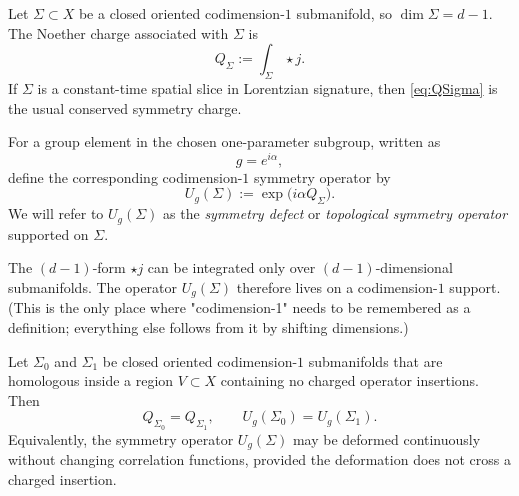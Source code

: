 \begin{definition}\label{def:zero-form-charge}
Let $\Sigma \subset X$ be a closed oriented codimension-$1$ submanifold, so $\dim \Sigma = d-1$. The Noether charge associated with $\Sigma$ is
\begin{equation}\label{eq:QSigma}
Q_\Sigma := \int_\Sigma \star j.
\end{equation}
If $\Sigma$ is a constant-time spatial slice in Lorentzian signature, then \eqref{eq:QSigma} is the usual conserved symmetry charge.
\end{definition}

\begin{definition}\label{def:zero-form-defect}
For a group element in the chosen one-parameter subgroup, written as
\begin{equation*}
g=e^{i\alpha},
\end{equation*}
define the corresponding codimension-$1$ symmetry operator by
\begin{equation}\label{eq:UgSigma}
U_g(\Sigma) := \exp\!\bigl(i\alpha Q_\Sigma\bigr).
\end{equation}
We will refer to $U_g(\Sigma)$ as the \emph{symmetry defect} or \emph{topological symmetry operator} supported on $\Sigma$.
\end{definition}

\begin{remark}\label{rem:codim-one-zero-form}
The $(d-1)$-form $\star j$ can be integrated only over $(d-1)$-dimensional submanifolds. The operator $U_g(\Sigma)$ therefore lives on a codimension-$1$ support.  (This is the only place where "codimension-1" needs to be remembered as a definition; everything else follows from it by shifting dimensions.)
\end{remark}

\begin{proposition}\label{prop:zero-form-topological}
Let $\Sigma_0$ and $\Sigma_1$ be closed oriented codimension-$1$ submanifolds that are homologous inside a region $V \subset X$ containing no charged operator insertions. Then
\begin{equation}\label{eq:QSigma-invariant}
Q_{\Sigma_0}=Q_{\Sigma_1},
\qquad
U_g(\Sigma_0)=U_g(\Sigma_1).
\end{equation}
Equivalently, the symmetry operator $U_g(\Sigma)$ may be deformed continuously without changing correlation functions, provided the deformation does not cross a charged insertion.
\end{proposition}

